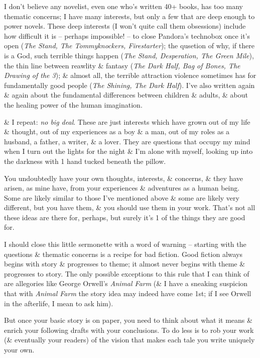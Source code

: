 \documentclass{article}
\numberwithin{equation}{section}
\begin{document}
I don't believe any novelist, even one who's written 40+ books, has too many thematic concerns; I have many interests, but only a few that are deep enough to power novels. These deep interests (I won't quite call them obsessions) include how difficult it is -- perhaps impossible! -- to close Pandora's technobox once it's open (\textit{The Stand, The Tommyknockers, Firestarter}); the qusetion of why, if there is a God, such terrible things happen (\textit{The Stand, Desperation, The Green Mile}), the thin line between reawlity \& fantasy (\textit{The Dark Half, Bag of Bones, The Drawing of the 3}); \& almost all, the terrible attraction violence sometimes has for fundamentally good people (\textit{The Shining, The Dark Half}). I've also written again \& again about the fundamental differences between children \& adults, \& about the healing power of the human imagination.

\& I repeat: \textit{no big deal}. These are just interests which have grown out of my life \& thought, out of my experiences as a boy \& a man, out of my roles as a husband, a father, a writer, \& a lover. They are questions that occupy my mind when I turn out the lights for the night \& I'm alone with myself, looking up into the darkness with 1 hand tucked beneath the pillow.

You undoubtedly have your own thoughts, interests, \& concerns, \& they have arisen, as mine have, from your experiences \& adventures as a human being. Some are likely similar to those I've mentioned above \& some are likely very different, but you have them, \& you should use them in your work. That's not all these ideas are there for, perhaps, but surely it's 1 of the things they are good for.

I should close this little sermonette with a word of warning -- starting with the questions \& thematic concerns is a recipe for bad fiction. Good fiction always begins with story \& progresses to theme; it almost never begins with theme \& progresses to story. The only possible exceptions to this rule that I can think of are allegories like George Orwell's \textit{Animal Farm} (\& I have a sneaking suspicion that with \textit{Animal Farm} the story idea may indeed have come 1st; if I see Orwell in the afterlife, I mean to ask him).

But once your basic story is on paper, you need to think about what it means \& enrich your following drafts with your conclusions. To do less is to rob your work (\& eventually your readers) of the vision that makes each tale you write uniquely your own.
\end{document}
